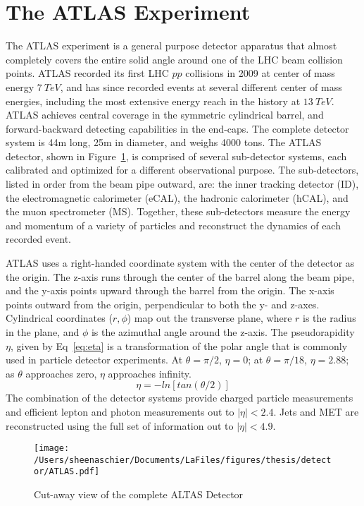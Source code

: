  
\section{The ATLAS Experiment}
\label{sec:ATLAS}
The ATLAS experiment is a general purpose detector apparatus that almost completely covers the entire solid angle around one of the LHC beam collision points.  ATLAS recorded its first LHC $pp$ collisions in 2009 at center of mass energy $7~TeV$, and has since recorded events at several different center of mass energies, including the most extensive energy reach in the history at $13~TeV$.  %
ATLAS achieves central coverage in the symmetric cylindrical barrel, and forward-backward detecting capabilities in the end-caps.  The complete detector system is 44m long, 25m in diameter, and weighs 4000 tons.  The ATLAS detector, shown in Figure~\ref{fig:ATLAS}, is comprised of several sub-detector systems, each calibrated and optimized for a different observational purpose.  The sub-detectors, listed in order from the beam pipe outward, are: the inner tracking detector (ID), the electromagnetic calorimeter (eCAL), the hadronic calorimeter (hCAL), and the muon spectrometer (MS).  Together, these sub-detectors measure the energy and momentum of a variety of particles and reconstruct the dynamics of each recorded event.  

ATLAS uses a right-handed coordinate system with the center of the detector as the origin.  The z-axis runs through the center of the barrel along the beam pipe, and the y-axis points upward through the barrel from the origin.  The x-axis points outward from the origin, perpendicular to both the y- and z-axes.  Cylindrical coordinates ($r,\phi$) map out the transverse plane, where $r$ is the radius in the plane, and $\phi$ is the azimuthal angle around the z-axis.  The pseudorapidity $\eta$, given by Eq~\ref{eq:eta} is a transformation of the polar angle that is commonly used in particle detector experiments.  At $\theta=\pi/2$, $\eta=0$; at $\theta=\pi/18$, $\eta=2.88$; as $\theta$ approaches zero, $\eta$ approaches infinity.
\begin{equation}
\eta=-ln[tan(\theta/2)]
\label{eq:eta}
\end{equation}
The combination of the detector systems provide charged particle measurements and efficient lepton and photon measurements out to $|\eta| < 2.4$.  Jets and MET are reconstructed using the full set of information out to $|\eta| < 4.9$.    \begin{figure}[tbp]
  \centering
 \texttt{[image: /Users/sheenaschier/Documents/LaFiles/figures/thesis/detector/ATLAS.pdf]}
    \caption{Cut-away view of the complete ALTAS Detector}
   \label{fig:ATLAS}
 \end{figure}

